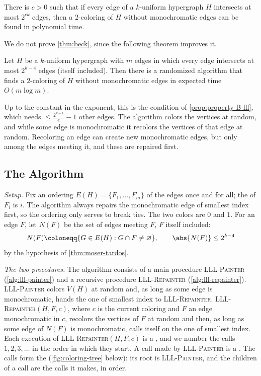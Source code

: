 \begin{theorem}[Beck, 1991]\label{thm:beck}
    There is \(c > 0\) such that if every edge of a \(k\)-uniform hypergraph \(H\) intersects at most \(2^{ck}\) edges, then a \(2\)-coloring of \(H\) without monochromatic edges can be found in polynomial time.
\end{theorem}

We do not prove \autoref{thm:beck}, since the following theorem improves it.

\begin{theorem}\label{thm:moser-tardos}
    Let \(H\) be a \(k\)-uniform hypergraph with \(m\) edges in which every edge intersects at most \(2^{k-4}\) edges (itself included). Then there is a randomized algorithm that finds a \(2\)-coloring of \(H\) without monochromatic edges in expected time \(O(m \log m)\).
\end{theorem}

Up to the constant in the exponent, this is the condition of \autoref{prop:property-B-lll}, which needs \(\le \frac{2^{k-1}}{e} - 1\) other edges. The algorithm colors the vertices at random, and while some edge is monochromatic it recolors the vertices of that edge at random. Recoloring an edge can create new monochromatic edges, but only among the edges meeting it, and these are repaired first.

\subsection{The Algorithm}\label{sec:alll-algorithm}

\emph{Setup.} Fix an ordering \(E(H) = \{ F_{1}, \ldots, F_{m} \}\) of the edges once and for all; the  of \(F_{i}\) is \(i\). The algorithm always repairs the monochromatic edge of smallest index first, so the ordering only serves to break ties. The two colors are \(0\) and \(1\). For an edge \(F\), let \(N(F)\) be the set of edges meeting \(F\), \(F\) itself included:
\[
    N(F) \coloneqq \{ G \in E(H) : G \cap F \ne \varnothing \},
    \qquad \abs{N(F)} \le 2^{k-4}
\]
by the hypothesis of \autoref{thm:moser-tardos}.

\emph{The two procedures.} The algorithm consists of a main procedure \textsc{LLL-Painter} (\autoref{alg:lll-painter}) and a recursive procedure \textsc{LLL-Repainter} (\autoref{alg:lll-repainter}). \textsc{LLL-Painter} colors \(V(H)\) at random and, as long as some edge is monochromatic, hands the one of smallest index to \textsc{LLL-Repainter}. \textsc{LLL-Repainter}\((H, F, c)\), where \(c\) is the current coloring and \(F\) an edge monochromatic in \(c\), recolors the vertices of \(F\) at random and then, as long as some edge of \(N(F)\) is monochromatic, calls itself on the one of smallest index. Each execution of \textsc{LLL-Repainter}\((H, F, c)\) is a , and we number the calls \(1, 2, 3, \ldots\) in the order in which they start. A call made by \textsc{LLL-Painter} is a . The calls form the  (\autoref{fig:coloring-tree} below): its root is \textsc{LLL-Painter}, and the children of a call are the calls it makes, in order.

